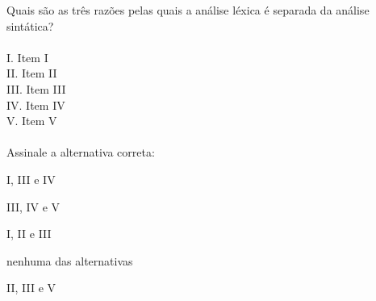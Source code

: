 \question[10]

Quais são as três razões pelas quais a análise léxica é separada da análise sintática?\\
\\
I. Item I\\
II. Item II\\
III. Item III\\
IV. Item IV\\
V. Item V\\
\\
Assinale a alternativa correta:
\begin{choices}
\item I, III e IV
\item III, IV e V
\item I, II e III
\item nenhuma das alternativas
\item II, III e V %
\end{choices}
\answerline

